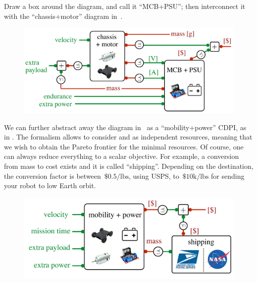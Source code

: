 \begin{example}

\noindent Draw a box around the diagram, and call it ``MCB+PSU'';
then interconnect it with the ``chassis+motor'' diagram in~.

\noindent 
\begin{figure}[H]
\begin{centering}
\includegraphics[scale=0.33]{gmcdp_mobility_power}
\par\end{centering}
\caption{\label{fig:another}}
\end{figure}

We can further abstract away the diagram in~ as
a ``mobility+power'' CDPI, as in . The formalism
allows to consider  and  as independent resources,
meaning that we wish to obtain the Pareto frontier for the minimal
resources. Of course, one can always reduce everything to a scalar
objective. For example, a conversion from mass to cost exists and
it is called ``shipping''. Depending on the destination, the conversion
factor is between~$\$0.5/\mbox{lbs}$, using USPS, to~$\$10\mbox{k}/\mbox{lbs}$
for sending your robot to low Earth orbit. 

\noindent 
\begin{figure}[H]
\centering{}\includegraphics[scale=0.33]{gmcdp_shipping}\caption{\label{fig:shipping}}
\end{figure}


\end{example}
